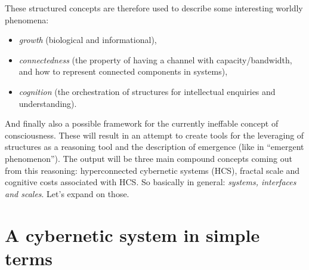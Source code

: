 \documentclass[14pt,a4paper]{extarticle}
\begin{document}
These structured concepts are therefore used to describe some interesting worldly phenomena:

\begin{itemize}
\item \textit{growth} (biological and informational),
\item \textit{connectedness} (the property of having a channel with capacity/bandwidth, and how to represent connected components in systems), 
\item \textit{cognition} (the orchestration of structures for intellectual enquiries and understanding).
\end{itemize}
And finally also a possible framework for the currently ineffable concept of consciousness.
These will result in an attempt to create tools for the leveraging of structures as a reasoning tool and the description of emergence (like in “emergent phenomenon”). The output will be three main compound concepts coming out from this reasoning: hyperconnected cybernetic systems (HCS), fractal scale and cognitive costs associated with HCS. So basically in general: \textit{systems, interfaces and scales}. Let’s expand on those.

\section*{A cybernetic system in simple terms}
\label{sec:cybernetics}
\end{document}
